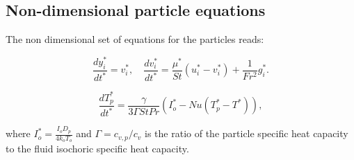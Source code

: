 \documentclass[a4paper,10pt]{report}
\begin{document}
\subsection*{Non-dimensional particle equations}

The non dimensional set of equations for the particles reads:

\begin{equation}
\label{eq:part_motion}
\frac{d y_i^*}{dt^*} = v_i^*, \quad \frac{d v_i^*}{dt^*} = \frac{\mu^*}{St}\left(u_i^* - v_i^*\right) + \frac{1}{Fr^2}g_i^*.
\end{equation}

\begin{equation}
\label{eq:part_energy}
\frac{d T_p^*}{dt^*} = \frac{\gamma}{3\Gamma St Pr} \left(I_o^* - Nu(T_p^*-T^*)\right),
\end{equation}

where $I_o^*=\frac{I_o D_p}{4k_oT_o}$ and $\Gamma=c_{v,p}/c_{v}$ is the ratio of the particle specific heat capacity to the fluid isochoric specific heat capacity. 







\end{document}
